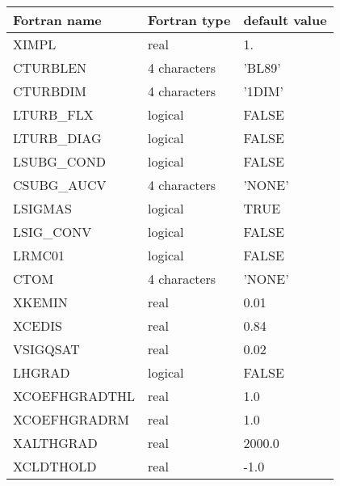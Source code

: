 \begin{center}
\begin{tabular} {|l|l|l|}
\hline
Fortran name & Fortran type & default value \\
\hline
XIMPL       &  real          & 1.     \\
CTURBLEN    &  4 characters  & 'BL89'   \\
CTURBDIM    &  4 characters  & '1DIM'   \\
LTURB\_FLX  &  logical       & FALSE  \\
LTURB\_DIAG &  logical       & FALSE  \\
LSUBG\_COND &  logical       & FALSE  \\
CSUBG\_AUCV &  4 characters  & 'NONE' \\
LSIGMAS     &  logical       & TRUE   \\
LSIG\_CONV  &  logical       & FALSE   \\
LRMC01      &  logical       & FALSE  \\
CTOM        &  4 characters  & 'NONE'   \\
XKEMIN      &  real          & 0.01 \\
XCEDIS      &  real          & 0.84 \\
VSIGQSAT    & real           & 0.02 \\
LHGRAD      & logical        & FALSE \\
XCOEFHGRADTHL & real         & 1.0   \\
XCOEFHGRADRM  & real         & 1.0   \\
XALTHGRAD     & real         & 2000.0 \\
XCLDTHOLD     & real         & -1.0   \\
\hline
\end{tabular}
\end{center}

